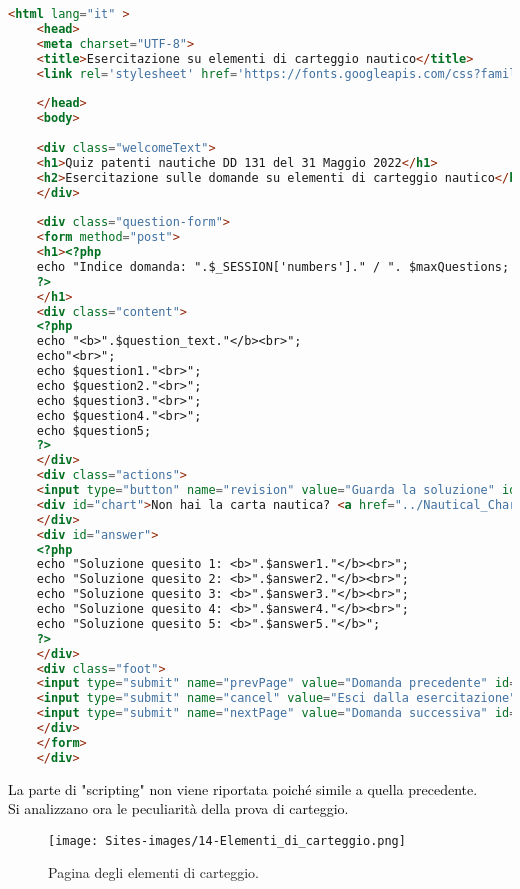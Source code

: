 \begin{lstlisting}[language=html]
	<html lang="it" >
	<head>
	<meta charset="UTF-8">
	<title>Esercitazione su elementi di carteggio nautico</title>
	<link rel='stylesheet' href='https://fonts.googleapis.com/css?family=Rubik:400,700'><link rel="stylesheet" href="exerciseStyle.css">
	
	</head>
	<body>  
	
	<div class="welcomeText">
	<h1>Quiz patenti nautiche DD 131 del 31 Maggio 2022</h1>
	<h2>Esercitazione sulle domande su elementi di carteggio nautico</h2>
	</div>
	
	<div class="question-form">
	<form method="post">
	<h1><?php
	echo "Indice domanda: ".$_SESSION['numbers']." / ". $maxQuestions;
	?>
	</h1>
	<div class="content">
	<?php 
	echo "<b>".$question_text."</b><br>";
	echo"<br>";
	echo $question1."<br>";
	echo $question2."<br>";
	echo $question3."<br>";
	echo $question4."<br>";
	echo $question5;
	?> 
	</div>
	<div class="actions">
	<input type="button" name="revision" value="Guarda la soluzione" id="revision" onclick="check()"/>
	<div id="chart">Non hai la carta nautica? <a href="../Nautical_Charts/Carta_Nautica_5D.pdf" download> Scaricala qui</a></div>
	</div>
	<div id="answer">
	<?php
	echo "Soluzione quesito 1: <b>".$answer1."</b><br>";
	echo "Soluzione quesito 2: <b>".$answer2."</b><br>";
	echo "Soluzione quesito 3: <b>".$answer3."</b><br>";
	echo "Soluzione quesito 4: <b>".$answer4."</b><br>";
	echo "Soluzione quesito 5: <b>".$answer5."</b>";
	?>
	</div>
	<div class="foot">
	<input type="submit" name="prevPage" value="Domanda precedente" id="button3"/>
	<input type="submit" name="cancel" value="Esci dalla esercitazione" id="button2"/>
	<input type="submit" name="nextPage" value="Domanda successiva" id="button1"/>
	</div>
	</form>
	</div>
\end{lstlisting}

\textcolor{black}{La parte di "scripting" non viene riportata poiché simile a quella precedente.}\\
\bigskip
\textcolor{black}{Si analizzano ora le peculiarità della prova di carteggio.}\\

\begin{figure}[h]
	\begin{center}
		\texttt{[image: Sites-images/14-Elementi\_di\_carteggio.png]}
		\caption{Pagina degli elementi di carteggio.}
	\end{center}
\end{figure}

